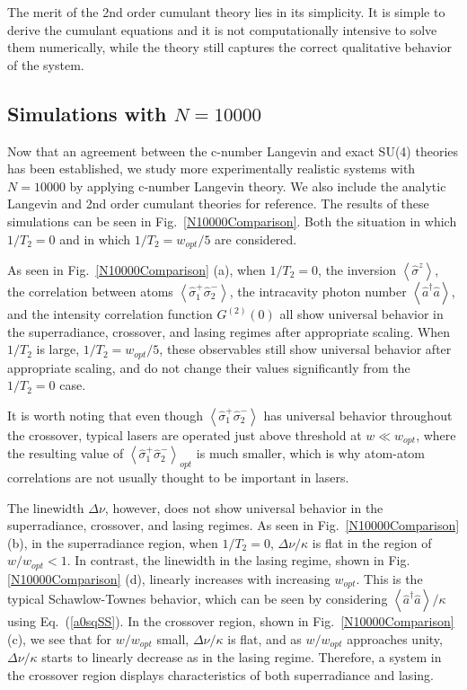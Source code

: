 \documentclass[aps,prl,twocolumn,
superscriptaddress,groupedaddress]{revtex4}
\begin{document}
The merit of the 2nd order cumulant theory lies in its simplicity. It is
simple to derive the cumulant equations and it is not computationally
intensive to solve them numerically, while the theory still captures the
correct qualitative behavior of the system.


\subsection{Simulations with $N=10000$}

Now that an agreement between the c-number Langevin and exact SU(4)
theories has been established, we study more experimentally realistic
systems with $N=10000$ by applying c-number Langevin theory. We also
include the analytic Langevin and 2nd order cumulant theories for
reference. The results of these simulations can be seen in
Fig.~\ref{N10000Comparison}. Both the situation in which $1/T_2=0$ and
in which $1/T_2=w_{opt}/5$ are considered.

As seen in Fig.~\ref{N10000Comparison} (a), when $1/T_2=0$, the
inversion $\left<\hat{\sigma}^{z}\right>$, the correlation between atoms
$\left<\hat{\sigma}_{1}^{+} \hat{\sigma}_{2}^{-}\right>$, the
intracavity photon number  $\left<\hat{a}^{\dagger}\hat{a}\right>$,  and
the intensity correlation function $G^{(2)}(0)$ all show universal
behavior in the superradiance, crossover, and lasing regimes after
appropriate scaling. When $1/T_2$ is large, $1/T_2=w_{opt}/5$, these
observables still show universal behavior after appropriate scaling, and
do not change their values significantly from the $1/T_2=0$ case.

It is worth noting that even though  $\left<\hat{\sigma}_{1}^{+}
\hat{\sigma}_{2}^{-}\right>$ has universal behavior throughout the
crossover, typical lasers are operated just above threshold at $w \ll
w_{opt}$, where the resulting value of
$\left<\hat{\sigma}_{1}^{+}\hat{\sigma}_{2}^{-}\right>_{opt}$ is much
smaller, which is why atom-atom correlations are not usually thought to
be important in lasers.

The linewidth $\Delta \nu$, however, does not show universal behavior in
the superradiance, crossover, and lasing regimes. As seen in
Fig.~\ref{N10000Comparison} (b), in the superradiance region, when
$1/T_2=0$, $\Delta \nu / \kappa$ is flat in the region of $w/w_{opt}<1$.
In contrast, the linewidth in the lasing regime, shown in
Fig.\ref{N10000Comparison} (d), linearly increases with increasing
$w_{opt}$. This is the typical Schawlow-Townes behavior, which can be
seen by considering $\left<\hat{a}^{\dagger}\hat{a}\right>/\kappa$ using
Eq.~(\ref{a0sqSS}). In the crossover region, shown in
Fig.~\ref{N10000Comparison} (c), we see that for $w/w_{opt}$ small,
$\Delta \nu/\kappa$ is flat, and as $w/w_{opt}$ approaches unity,
$\Delta \nu/\kappa$ starts to linearly decrease as in the lasing regime.
Therefore, a system in the crossover region displays characteristics of
both superradiance and lasing.
\end{document}
